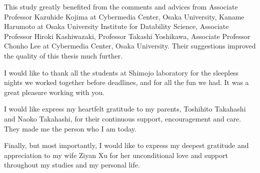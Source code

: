 This study greatly benefited from the comments and advices from Associate
Professor Kazuhide Kojima at Cybermedia Center, Osaka University, Kaname
Harumoto at Osaka University Institute for Datability Science, Associate
Professor Hiroki Kashiwazaki, Professor Takashi Yoshikawa, Associate Professor
Chonho Lee at Cybermedia Center, Osaka University. Their suggestions improved
the quality of this thesis much further.

I would like to thank all the students at Shimojo laboratory for the sleepless
nights we worked together before deadlines, and for all the fun we had. It was
a great pleasure working with you.

I would like express my heartfelt gratitude to my parents, Toshihito Takahashi
and Naoko Takahashi, for their continuous support, encouragement and care. They
made me the person who I am today.

Finally, but most importantly, I would like to express my deepest gratitude
and appreciation to my wife Ziyan Xu for her unconditional love and support
throughout my studies and my personal life.

